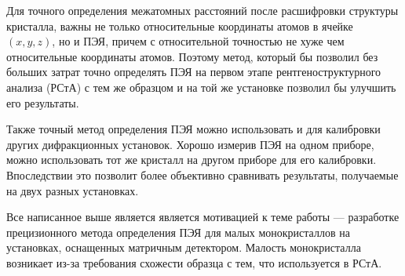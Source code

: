 Для точного определения межатомных расстояний после расшифровки структуры кристалла, важны не только относительные координаты атомов в ячейке $(x, y, z)$, но и ПЭЯ, причем с относительной точностью не хуже чем относительные координаты атомов.
Поэтому метод, который бы позволил без больших затрат точно определять ПЭЯ на первом этапе рентгеноструктурного анализа (РСтА) с тем же образцом и на той же установке позволил бы улучшить его результаты.

Также точный метод определения ПЭЯ можно использовать и для калибровки других дифракционных установок.
Хорошо измерив ПЭЯ на одном приборе, можно использовать тот же кристалл на другом приборе для его калибровки.
Впоследствии это позволит более объективно сравнивать результаты, получаемые на двух разных установках.

Все написанное выше является является мотивацией к теме работы --- разработке прецизионного метода определения ПЭЯ для малых монокристаллов на установках, оснащенных матричным детектором.
Малость монокристалла возникает из-за требования схожести образца с тем, что используется в РСтА.